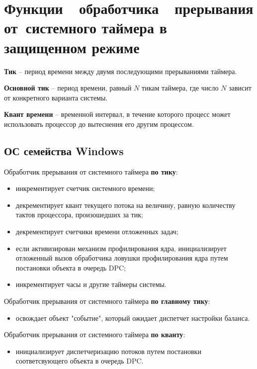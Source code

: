 \chapter{Функции~~обработчика~~прерывания от~системного
таймера в защищенном режиме}

\textbf{Тик} -- период времени между двумя последующими прерываниями таймера.

\textbf{Основной тик} -- период времени, равный $N$ тикам таймера, где число
$N$ зависит от конкретного варианта системы.

\textbf{Квант времени} -- временной интервал, в течение которого процесс
может использовать процессор до вытеснения его другим процессом.

\section{ОС семейства Windows}

Обработчик прерывания от системного таймера \textbf{по тику}:
\begin{itemize}[left=\parindent]
    \item инкрементирует счетчик системного времени;
    \item декрементирует квант текущего потока на величину, равную количеству
          тактов процессора, произошедших за тик;
    \item декрементирует счетчики времени отложенных задач;
    \item если активизирован механизм профилирования ядра, инициализирует
          отложенный вызов обработчика ловушки профилирования ядра путем
          постановки объекта в очередь DPC;
    \item инкрементирует часы и другие таймеры системы.
\end{itemize}

Обработчик прерывания от системного таймера \textbf{по главному тику}:
\begin{itemize}[left=\parindent]
    \item освождает объект "событие"{}, который ожидает диспетчет настройки
          баланса.
\end{itemize}

Обработчик прерывания от системного таймера \textbf{по кванту}:
\begin{itemize}[left=\parindent]
    \item инициализирует диспетчеризацию потоков путем постановки
          соответсвующего объекта в очередь DPC.
\end{itemize}

